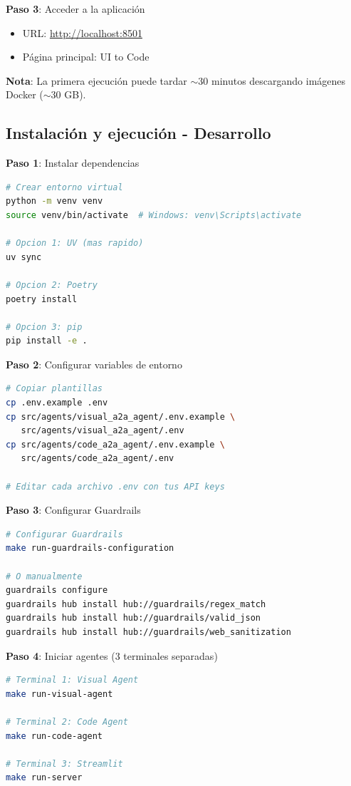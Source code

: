 \documentclass[12pt,a4paper]{article}
\begin{document}
\textbf{Paso 3}: Acceder a la aplicación

\begin{itemize}
    \item URL: \url{http://localhost:8501}
    \item Página principal: UI to Code
\end{itemize}

\textbf{Nota}: La primera ejecución puede tardar $\sim$30 minutos descargando imágenes Docker ($\sim$30 GB).

\subsection{Instalación y ejecución - Desarrollo}

\textbf{Paso 1}: Instalar dependencias

\begin{lstlisting}[language=bash]
# Crear entorno virtual
python -m venv venv
source venv/bin/activate  # Windows: venv\Scripts\activate

# Opcion 1: UV (mas rapido)
uv sync

# Opcion 2: Poetry
poetry install

# Opcion 3: pip
pip install -e .
\end{lstlisting}

\textbf{Paso 2}: Configurar variables de entorno

\begin{lstlisting}[language=bash]
# Copiar plantillas
cp .env.example .env
cp src/agents/visual_a2a_agent/.env.example \
   src/agents/visual_a2a_agent/.env
cp src/agents/code_a2a_agent/.env.example \
   src/agents/code_a2a_agent/.env

# Editar cada archivo .env con tus API keys
\end{lstlisting}

\textbf{Paso 3}: Configurar Guardrails

\begin{lstlisting}[language=bash]
# Configurar Guardrails
make run-guardrails-configuration

# O manualmente
guardrails configure
guardrails hub install hub://guardrails/regex_match
guardrails hub install hub://guardrails/valid_json
guardrails hub install hub://guardrails/web_sanitization
\end{lstlisting}

\textbf{Paso 4}: Iniciar agentes (3 terminales separadas)

\begin{lstlisting}[language=bash]
# Terminal 1: Visual Agent
make run-visual-agent

# Terminal 2: Code Agent
make run-code-agent

# Terminal 3: Streamlit
make run-server
\end{lstlisting}
\end{document}
